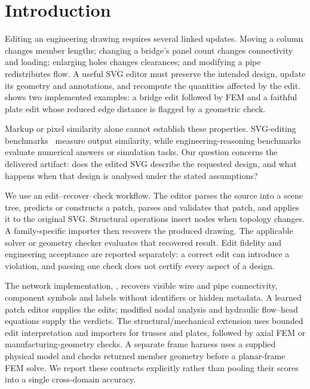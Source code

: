 \section{Introduction}
\label{sec:intro}

Editing an engineering drawing requires several linked updates. Moving a column changes member lengths;
changing a bridge's panel count changes connectivity and loading; enlarging holes changes clearances;
and modifying a pipe redistributes flow. A useful SVG editor must preserve the intended design, update
its geometry and annotations, and recompute the quantities affected by the edit.
 shows two implemented examples: a bridge edit followed by FEM and a faithful plate
edit whose reduced edge distance is flagged by a geometric check.

Markup or pixel similarity alone cannot establish these properties. SVG-editing
benchmarks~\cite{svgeditbench,scidiagramedit} measure output similarity, while engineering-reasoning
benchmarks~\cite{feabench,fem_bench,pdeagent_bench} evaluate numerical answers or simulation tasks.
Our question concerns the delivered artifact: does the edited SVG describe the requested design,
and what happens when that design is analysed under the stated assumptions?

We use an edit--recover--check workflow. The editor parses the source into a scene tree, predicts or constructs a patch, parses and validates
that patch, and applies it to the original SVG. Structural operations insert nodes when topology changes. A family-specific importer
then recovers the produced drawing. The applicable solver or geometry checker evaluates that recovered
result. Edit fidelity and engineering acceptance are reported separately: a correct edit can introduce
a violation, and passing one check does not certify every aspect of a design.

The network implementation, \ours, recovers visible wire and pipe connectivity, component symbols and
labels without identifiers or hidden metadata. A learned patch editor supplies the edits; modified nodal
analysis and hydraulic flow--head equations supply the verdicts. The structural/mechanical extension
uses bounded edit interpretation and importers for trusses and plates, followed by axial FEM or
manufacturing-geometry checks. A separate frame harness uses a supplied physical model and checks
returned member geometry before a planar-frame FEM solve. We report these contracts explicitly rather
than pooling their scores into a single cross-domain accuracy.

